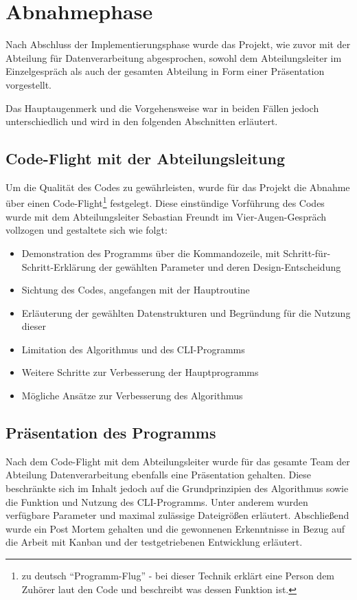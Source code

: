 \section{Abnahmephase}
\label{section:abnahmephase}
Nach Abschluss der Implementierungsphase wurde das Projekt, wie zuvor mit der
Abteilung für Datenverarbeitung abgesprochen, sowohl dem Abteilungsleiter im Einzelgespräch
als auch der gesamten Abteilung in Form einer Präsentation vorgestellt.

Das Hauptaugenmerk und die Vorgehensweise war in beiden Fällen jedoch unterschiedlich
und wird in den folgenden Abschnitten erläutert.

\subsection{Code-Flight mit der Abteilungsleitung}

Um die Qualität des Codes zu gewährleisten, wurde für das Projekt die Abnahme über einen Code-Flight\footnote{zu deutsch "`Programm-Flug"' - bei dieser Technik erklärt eine Person dem Zuhörer laut den Code und beschreibt was dessen Funktion ist.} festgelegt. Diese einstündige
Vorführung des Codes wurde mit dem Abteilungsleiter Sebastian Freundt im
Vier-Augen-Gespräch vollzogen und gestaltete sich wie folgt:

\begin{itemize}
    \item Demonstration des Programms über die Kommandozeile, mit Schritt-für-Schritt-Erklärung der gewählten Parameter und deren Design-Entscheidung
    \item Sichtung des Codes, angefangen mit der Hauptroutine
    \item Erläuterung der gewählten Datenstrukturen und Begründung für die Nutzung dieser
    \item Limitation des Algorithmus und des CLI-Programms
    \item Weitere Schritte zur Verbesserung der Hauptprogramms
    \item Mögliche Ansätze zur Verbesserung des Algorithmus
\end{itemize}

\subsection{Präsentation des Programms}

Nach dem Code-Flight mit dem Abteilungsleiter wurde für das gesamte Team der Abteilung Datenverarbeitung ebenfalls eine Präsentation gehalten.
Diese beschränkte sich im Inhalt jedoch auf die Grundprinzipien des Algorithmus sowie
die Funktion und Nutzung des CLI-Programms. Unter anderem wurden verfügbare
Parameter und maximal zulässige Dateigrößen erläutert.
Abschließend wurde ein Post Mortem gehalten und die gewonnenen Erkenntnisse in Bezug auf die Arbeit mit Kanban und der testgetriebenen Entwicklung erläutert.
